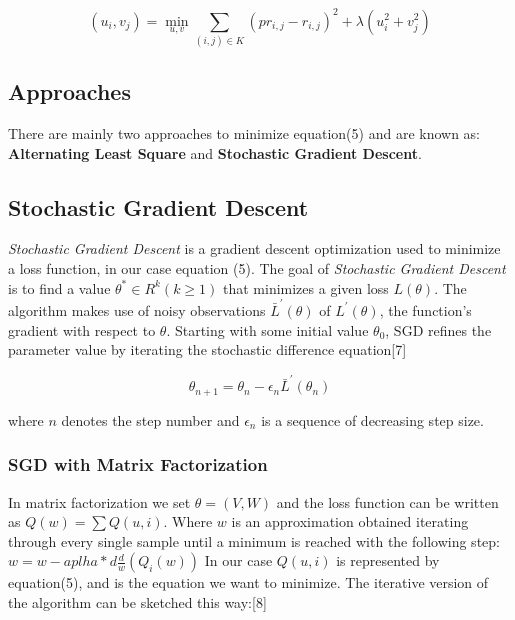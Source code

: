 \documentclass{sig-alternate-05-2015}
\begin{document}
\begin{equation}
    {(u_{i},v_{j}) = \min_{u,v} {\sum\limits_{(i,j) \in K} {(pr_{i,j} - r_{i,j})}^{2} + \lambda(u_{i}^{2} + v_{j}^{2}) }}
\end{equation}


\subsection{Approaches}
There are mainly two approaches to minimize equation(5) and are known as:\\
\textbf{Alternating Least Square} and \textbf{Stochastic Gradient Descent}.

\subsection{Stochastic Gradient Descent}

\textit{Stochastic Gradient Descent} is a gradient descent optimization used
to minimize a loss function, in our case equation (5).
The goal of \textit{Stochastic Gradient Descent} is to find a value
$\theta^{*} \in R^{k} (k \geq 1) $ that minimizes a given loss $L(\theta)$.
The algorithm makes use of noisy observations $\bar{L}^{\prime}(\theta)$
of $L^{\prime}(\theta)$, the function's gradient with respect to $\theta$.
Starting with some initial value $\theta_{0}$, SGD refines the parameter
value by iterating the stochastic difference equation[7]

\begin{equation}
    {\theta_{n+1} = \theta_{n} - \epsilon_{n} \bar{L}^{\prime}(\theta_{n})}
\end{equation}

where $n$ denotes the step number and $\epsilon_{n}$ is a sequence of
decreasing step size.

\subsubsection{SGD with Matrix Factorization}

In matrix factorization we set $\theta = (V,W)$ and the loss function
can be written as $ Q(w) = {\sum Q(u,i)}$. Where $w$ is an approximation
obtained iterating through every single sample until a minimum is reached with
the following step: $w= w - aplha * d{\frac dw}(Q_{i}(w)) $
In our case $Q(u,i)$ is represented by equation(5), and is the equation
we want to minimize.
The iterative version of the algorithm can be sketched this way:[8]\\
\end{document}
